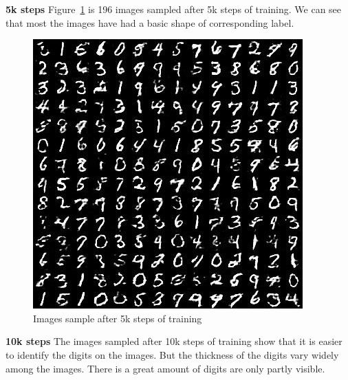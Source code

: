 \textbf{5k steps}
Figure~\ref{sample25} is 196 images sampled after 5k steps of training. We can see that most the images have had a basic shape of corresponding label.


\begin{figure}[ht]
\begin{center}
\includegraphics[width=\columnwidth]{figures/sample_0025}
\caption{\label{sample25} Images sample after 5k steps of training}
\end{center}
\vspace{-0.45cm}
\end{figure}

\textbf{10k steps}
The images sampled after 10k steps of training show that it is easier to identify the digits on the images. But the thickness of the digits vary widely among the images. There is a great amount of digits are only partly visible.

